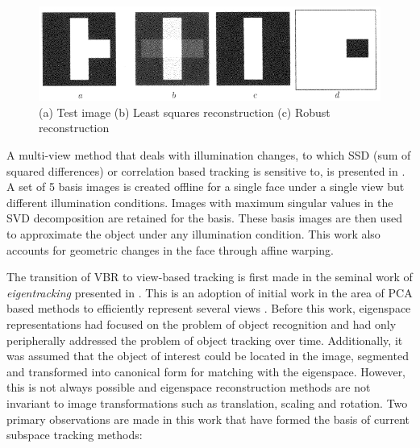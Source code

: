 \begin{Body}
								\begin{figure}
								\center
								\includegraphics[width=1.0\textwidth]{thesis/TrackingPapers_SubspaceTracking_1998_Black_fig3_nocaption.png}
								\caption{(a) Test image (b) Least squares reconstruction (c) Robust reconstruction \cite{1998_JNL_Eigentracking_Black}}
								\end{figure}

A multi-view method that deals with illumination changes, to which SSD (sum of squared differences) or correlation based tracking is sensitive to, is presented in \cite{1996_TRK_region_Hager}.  A set of 5 basis images is created offline for a single face under a single view but different illumination conditions.  Images with maximum singular values in the SVD decomposition are retained for the basis.  These basis images are then used to approximate the object under any illumination condition.  This work also accounts for geometric changes in the face through affine warping.  

The transition of VBR to view-based tracking is first made in the seminal work of \emph{eigentracking} presented in \cite{1998_JNL_Eigentracking_Black}.  This is an adoption of initial work in the area of PCA based methods to efficiently represent several views \cite{1995_JNL_ActiveModels_Cootes, 1991_CNF_Eigenfaces_Turk}.  Before this work, eigenspace representations had focused on the problem of object recognition and had only peripherally addressed the problem of object tracking over time.  Additionally, it was assumed that the object of interest could be located in the image, segmented and transformed into canonical form for matching with the eigenspace.  However, this is not always possible and eigenspace reconstruction methods are not invariant to image transformations such as translation, scaling and rotation.  Two primary observations are made in this work that have formed the basis of current subspace tracking methods:


\end{Body}
